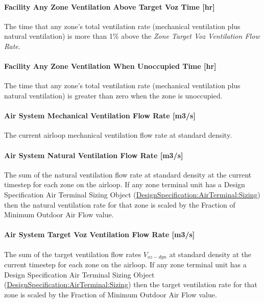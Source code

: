\paragraph{Facility Any Zone Ventilation Above Target Voz Time {[}hr{]}}\label{facility-any-zone-ventilation-above-target-voz-time}
The time that any zone's total ventilation rate (mechanical ventilation plus natural ventilation) is more than 1\% above the \emph{Zone Target Voz Ventilation Flow Rate}.

\paragraph{Facility Any Zone Ventilation When Unoccupied Time {[}hr{]}}\label{facility-any-zone-ventilation-when-unoccupied-time}
The time that any zone's total ventilation rate (mechanical ventilation plus natural ventilation) is greater than zero when the zone is unoccupied.

\paragraph{Air System Mechanical Ventilation Flow Rate {[}m3/s{]}}\label{air-system-mechanical-ventilation-flow-rate}
The current airloop mechanical ventilation flow rate at standard density.

\paragraph{Air System Natural Ventilation Flow Rate {[}m3/s{]}}\label{air-system-natural-ventilation-flow-rate}
The sum of the natural ventilation flow rate at standard density at the current timestep for each zone on the airloop. If any zone terminal unit has a Design Specification Air Terminal Sizing Object  (\hyperref[designspecificationairterminalsizing]{DesignSpecification:AirTerminal:Sizing}) then the natural ventilation rate for that zone is scaled by the Fraction of Minimum Outdoor Air Flow value.

\paragraph{Air System Target Voz Ventilation Flow Rate {[}m3/s{]}}\label{air-system-target-voz-ventilation-flow-rate}
The sum of the target ventilation flow rates \(V_{oz-dyn}\) at standard density at the current timestep for each zone on the airloop. If any zone terminal unit has a Design Specification Air Terminal Sizing Object  (\hyperref[designspecificationairterminalsizing]{DesignSpecification:AirTerminal:Sizing}) then the target ventilation rate for that zone is scaled by the Fraction of Minimum Outdoor Air Flow value.

